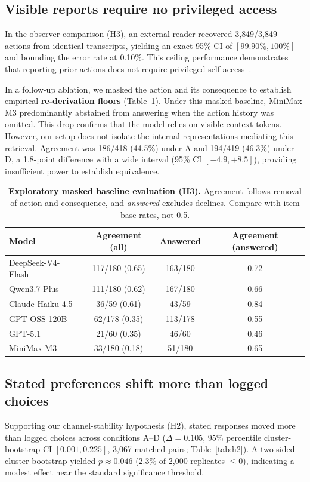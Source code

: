 \documentclass[10pt,a4paper]{article}
\begin{document}
\subsection{Visible reports require no privileged access}
In the observer comparison (H3), an external reader recovered 3{,}849/3{,}849 actions from identical transcripts, yielding an exact 95\% CI of $[99.90\%, 100\%]$ and bounding the error rate at 0.10\%. This ceiling performance demonstrates that reporting prior actions does not require privileged self-access~\cite{song2025b}.

In a follow-up ablation, we masked the action and its consequence to establish empirical \textbf{re-derivation floors} (Table~\ref{tab:masked}). Under this masked baseline, MiniMax-M3 predominantly abstained from answering when the action history was omitted. This drop confirms that the model relies on visible context tokens. However, our setup does not isolate the internal representations mediating this retrieval. Agreement was 186/418 (44.5\%) under A and 194/419 (46.3\%) under D, a 1.8-point difference with a wide interval (95\% CI $[-4.9, +8.5]$), providing insufficient power to establish equivalence.

\begin{table}[t]
\centering\small
\caption{\textbf{Exploratory masked baseline evaluation (H3).} Agreement follows removal of action and consequence, and \emph{answered} excludes declines. Compare with item base rates, not 0.5.}
\label{tab:masked}
\begin{tabular}{lccc}
\toprule
Model & Agreement (all) & Answered & Agreement (answered)\\
\midrule
DeepSeek-V4-Flash & 117/180 (0.65) & 163/180 & 0.72\\
Qwen3.7-Plus & 111/180 (0.62) & 167/180 & 0.66\\
Claude Haiku 4.5 & 36/59 (0.61) & 43/59 & 0.84\\
GPT-OSS-120B & 62/178 (0.35) & 113/178 & 0.55\\
GPT-5.1 & 21/60 (0.35) & 46/60 & 0.46\\
MiniMax-M3 & 33/180 (0.18) & 51/180 & 0.65\\
\bottomrule
\end{tabular}
\end{table}

\subsection{Stated preferences shift more than logged choices}
Supporting our channel-stability hypothesis (H2), stated responses moved more than logged choices across conditions A--D ($\Delta=0.105$, 95\% percentile cluster-bootstrap CI $[0.001, 0.225]$, 3{,}067 matched pairs; Table~\ref{tab:h2}). A two-sided cluster bootstrap yielded $p\approx0.046$ (2.3\% of 2{,}000 replicates $\le 0$), indicating a modest effect near the standard significance threshold.
\end{document}

